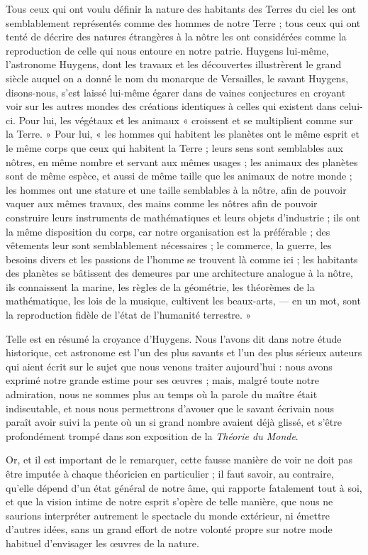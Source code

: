 \documentclass[a4paper, 11pt, oneside, landscape]{article}
\begin{document}
Tous ceux qui ont voulu définir la nature des habitants des Terres du ciel les ont semblablement représentés comme des hommes de notre Terre ; tous ceux qui ont tenté de décrire des natures étrangères à la nôtre les ont considérées comme la reproduction de celle qui nous entoure en notre patrie. Huygens lui-même, l'astronome Huygens, dont les travaux et les découvertes illustrèrent le grand siècle auquel on a donné le nom du monarque de Versailles, le savant Huygens, disons-nous, s'est laissé lui-même égarer dans de vaines conjectures en croyant voir sur les autres mondes des créations identiques à celles qui existent dans celui-ci. Pour lui, les végétaux et les animaux « croissent et se multiplient comme sur la Terre. » Pour lui, « les hommes qui habitent les planètes ont le même esprit et le même corps que ceux qui habitent la Terre ; leurs sens sont semblables aux nôtres, en même nombre et servant aux mêmes usages ; les animaux des planètes sont de même espèce, et aussi de même taille que les animaux de notre monde ; les hommes ont une stature et une taille semblables à la nôtre, afin de pouvoir vaquer aux mêmes travaux, des mains comme les nôtres afin de pouvoir construire leurs instruments de mathématiques et leurs objets d'industrie ; ils ont la même disposition du corps, car notre organisation est la préférable ; des vêtements leur sont semblablement nécessaires ; le commerce, la guerre, les besoins divers et les passions de l'homme se trouvent là comme ici ; les habitants des planètes se bâtissent des demeures par une architecture analogue à la nôtre, ils connaissent la marine, les règles de la géométrie, les théorèmes de la mathématique, les lois de la musique, cultivent les beaux-arts, --- en un mot, sont la reproduction fidèle de l'état de l'humanité terrestre. »

Telle est en résumé la croyance d'Huygens. Nous l'avons dit dans notre étude historique, cet astronome est l'un des plus savants et l'un des plus sérieux auteurs qui aient écrit sur le sujet que nous venons traiter aujourd'hui : nous avons exprimé notre grande estime pour ses œuvres ; mais, malgré toute notre admiration, nous ne sommes plus au temps où la parole du maître était indiscutable, et nous nous permettrons d'avouer que le savant écrivain nous paraît avoir suivi la pente où un si grand nombre avaient déjà glissé, et s'être profondément trompé dans son exposition de la \emph{Théorie du Monde}.

Or, et il est important de le remarquer, cette fausse manière de voir ne doit pas être imputée à chaque théoricien en particulier ; il faut savoir, au contraire, qu'elle dépend d'un état général de notre âme, qui rapporte fatalement tout à soi, et que la vision intime de notre esprit s'opère de telle manière, que nous ne saurions interpréter autrement le spectacle du monde extérieur, ni émettre d'autres idées, sans un grand effort de notre volonté propre sur notre mode habituel d'envisager les œuvres de la nature.
\end{document}
